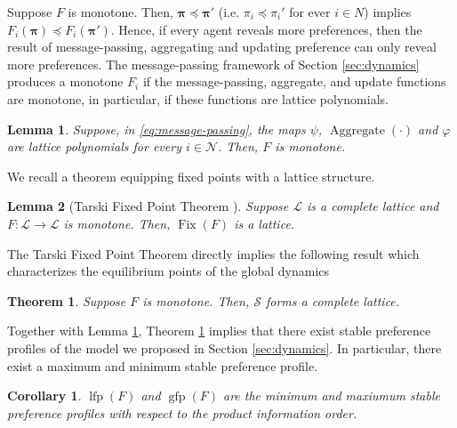 \documentclass[conference]{ieeeconf}
\newcommand{\N}{\mathcal{N}}
\renewcommand{\S}{\mathcal{S}}
\renewcommand{\L}{\mathcal{L}}
\newcommand{\profile}{\boldsymbol{\pi}}
\newcommand{\bigjoin}{\bigvee}
\newcommand{\bigmeet}{\bigwedge}
\DeclareMathOperator{\Fix}{Fix}
\DeclareMathOperator{\lfp}{lfp}
\DeclareMathOperator{\gfp}{gfp}
\DeclareMathOperator{\Aggregate}{Aggregate}
\newtheorem{theorem}{Theorem}
\newtheorem{lemma}{Lemma}
\newtheorem{corollary}{Corollary}
\begin{document}
Suppose $F$ is monotone. Then, $\profile \preceq \profile'$ (i.e. $\pi_i \preceq \pi_i'$ for ever $i \in N$) implies $F_i(\profile) \preceq F_i(\profile')$. Hence, if every agent reveals more preferences, then the result of message-passing, aggregating and updating preference can only reveal more preferences. The message-passing framework of Section \ref{sec:dynamics} produces a monotone $F_i$ if the message-passing, aggregate, and update functions are monotone, in particular, if these functions are lattice polynomials.

\begin{lemma} \label{lem:message-passing}
    Suppose, in \eqref{eq:message-passing}, the maps $\psi$, $\Aggregate(\cdot)$ and $\varphi$ are lattice polynomials for every $i \in \N$. Then, $F$ is monotone.
\end{lemma}


We recall a theorem equipping fixed points with a lattice structure.
\begin{lemma}[Tarski Fixed Point Theorem \cite{tarski}] \label{lem:tfpt}
    Suppose $\L$ is a complete lattice and $F: \L \to \L$ is monotone. Then, $\Fix(F)$ is a lattice.
\end{lemma}

The Tarski Fixed Point Theorem directly implies the following result which characterizes the equilibrium points of the global dynamics
\begin{theorem} \label{thm:dynamics}
    Suppose $F$ is monotone. Then, $\S$ forms a complete lattice.
\end{theorem}

Together with Lemma \ref{lem:message-passing}, Theorem \ref{thm:dynamics} implies that there exist stable preference profiles of the model we proposed in Section \ref{sec:dynamics}. In particular, there exist a maximum and minimum stable preference profile.

\begin{corollary}
    $\lfp(F)$ and $\gfp(F)$ are the minimum and maxiumum stable preference profiles with respect to the product information order.
\end{corollary}
\end{document}
